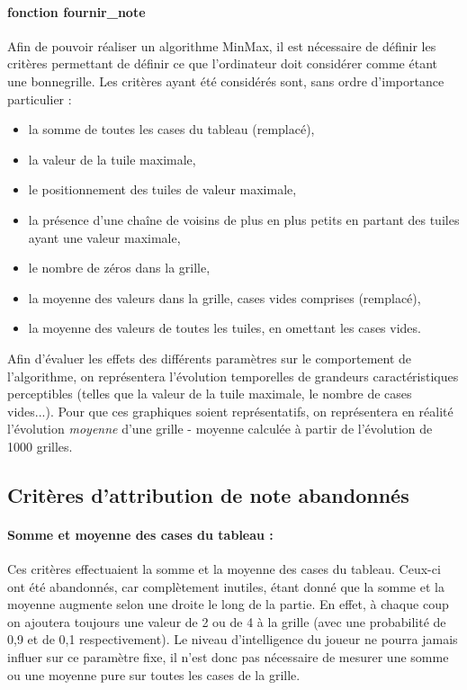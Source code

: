 \documentclass[a4paper]{report}
\begin{document}
\paragraph{fonction fournir\_note}
Afin de pouvoir réaliser un algorithme MinMax, il est nécessaire de définir les critères permettant de définir ce que l’ordinateur doit considérer comme étant une \og{}bonne\fg{}grille.
Les critères ayant été considérés sont, sans ordre d’importance particulier :
\begin{itemize}
\item la somme de toutes les cases du tableau (remplacé),
\item la valeur de la tuile maximale,
\item le positionnement des tuiles de valeur maximale,
\item la présence d’une chaîne de voisins de plus en plus petits en partant des tuiles ayant une valeur maximale,
\item le nombre de zéros dans la grille,
\item la moyenne des valeurs dans la grille, cases vides comprises (remplacé),
\item la moyenne des valeurs de toutes les tuiles, en omettant les cases vides.
\end{itemize}

Afin d'évaluer les effets des différents paramètres sur le comportement de l'algorithme, on représentera l'évolution temporelles de grandeurs caractéristiques perceptibles (telles que la valeur de la tuile maximale, le nombre de cases vides...). Pour que ces graphiques soient représentatifs, on représentera en réalité l'évolution \emph{moyenne} d'une grille - moyenne calculée à partir de l'évolution de 1000 grilles.

\subsection{Critères d’attribution de note abandonnés}
\paragraph{Somme et moyenne des cases du tableau :}
Ces critères effectuaient la somme et la moyenne des cases du tableau. Ceux-ci ont été abandonnés, car complètement inutiles, étant donné que la somme et la moyenne augmente selon une droite le long de la partie. En effet, à chaque coup on ajoutera toujours une valeur de 2 ou de 4 à la grille (avec une probabilité de 0,9 et de 0,1 respectivement). Le niveau d’intelligence du joueur ne pourra jamais influer sur ce paramètre fixe, il n’est donc pas nécessaire de mesurer une somme ou une moyenne pure sur toutes les cases de la grille.
\end{document}
